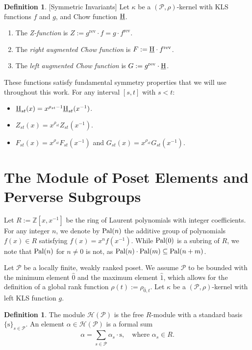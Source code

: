 \documentclass[11pt, letterpaper, english]{amsart}
\theoremstyle{teoremas}
\theoremstyle{definition}
\newtheorem{definition}[theorem]{Definition}
\newcommand{\rev}{\operatorname{rev}}
\newcommand{\calP}{\mathcal{P}}
\newcommand{\calH}{\mathcal{H}}
\newcommand{\chow}{\normalfont\text{\underline{H}}}
\newcommand{\ZZ}{\mathbb{Z}}
\newcommand{\Ebasis}[1]{\mathrm{#1}}
\newcommand{\pal}{\normalfont\text{Pal}}
\begin{document}
\begin{definition}\label{def:symmetric-invariants} [Symmetric Invariants]
    Let \(\kappa\) be a \((\calP,\rho)\)-kernel with KLS functions \(f\) and \(g\), and Chow function \(\chow\).
    \begin{enumerate}
        \item The \emph{Z-function} is \(Z := g^{\rev} \cdot f = g \cdot f^{\rev}\).
        \item The \emph{right augmented Chow function} is \(F := \chow \cdot f^{\rev}\).
        \item The \emph{left augmented Chow function} is \(G := g^{\rev} \cdot \chow\).
    \end{enumerate}
\end{definition}

These functions satisfy fundamental symmetry properties that we will use throughout this work. For any interval \([s,t]\) with \(s<t\):
\begin{itemize}
    \item \(\chow_{st}(x) = x^{\rho_{st} - 1} \chow_{st}(x^{-1})\).
    \item \(Z_{st}(x) = x^{\rho_{st}} Z_{st}(x^{-1})\).
    \item \(F_{st}(x) = x^{\rho_{st}} F_{st}(x^{-1})\) and \(G_{st}(x) = x^{\rho_{st}} G_{st}(x^{-1})\).
\end{itemize}

\section{The Module of Poset Elements and Perverse Subgroups}

Let \(R := \ZZ[x, x^{-1}]\) be the ring of Laurent polynomials with integer coefficients.
For any integer \(n\), we denote by \(\pal(n)\) the additive group of polynomials \(f(x) \in R\)
satisfying \(f(x) = x^n f(x^{-1})\). While \(\pal(0)\) is a subring of \(R\), we note that \(\pal(n)\)
for \(n \neq 0\) is not, as \(\pal(n) \cdot \pal(m) \subseteq \pal(n+m)\).

Let \(\calP\) be a locally finite, weakly ranked poset. We assume \(\calP\) to be bounded
with the minimum element \(\hat{0}\) and the maximum element \(\hat{1}\),
which allows for the definition of a global rank function \(\rho(t) := \rho_{\hat{0},t}\).
Let \(\kappa\) be a \((\calP, \rho)\)-kernel with left KLS function \(g\).

\begin{definition}\label{def:module-of-poset-elements}
    The module \(\calH(\calP)\) is the free \(R\)-module with a standard basis
    \(\{\Ebasis{s}\}_{s \in \calP}\). An element \(\alpha \in \calH(\calP)\) is a formal sum
    \[ \alpha = \sum_{s \in \calP} \alpha_s \cdot\Ebasis{s}, \quad \text{where } \alpha_s \in R. \]
\end{definition}
\end{document}

